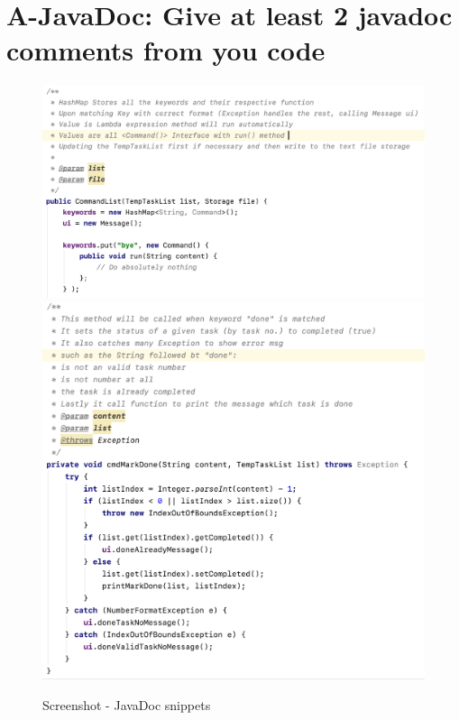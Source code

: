 \documentclass[a4paper,11pt, twoside]{article}
\begin{document}
\begin{table} [htbp]
\section* {A-JavaDoc: Give at least 2 javadoc comments from you code} 
\begin{figure}[H]
\centering
\includegraphics[width = 15.4cm]{jdoc.png}
\includegraphics[width = 14.8cm]{jdoc2.png}
\caption{Screenshot - JavaDoc snippets} 
\end{figure} 



\end{table}
\end{document}
